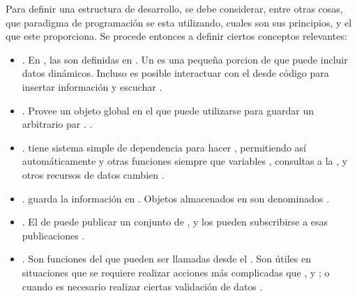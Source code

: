 Para definir una estructura de desarrollo, se debe considerar, entre otras cosas,  que paradigma de programación se esta utilizando, cuales son sus principios, y el \apiAS que este proporciona. Se procede entonces a definir ciertos conceptos relevantes:

	\begin{itemize}
		\item
			\textbf{\templatesMETEOR}. En \meteorNAME, las \viewsAS son definidas en \templatesMETEOR. Un \templateMETEOR es una pequeña porcion de \htmlNAME que puede incluir datos dinámicos. Incluso es posible interactuar con el \templateMETEOR desde código \javaScriptNAME para insertar información y escuchar \events \cite{online_meteor_documentation}.
		\item
			\textbf{\sessionMETEOR}. Provee un objeto global en el \clientAS que puede utilizarse para guardar un arbitrario par \keyValueDB. \cite{online_meteor_documentation}.
		\item
			\textbf{\trackerMETEOR}. \meteorNAME tiene sistema simple de dependencia para hacer \trackingMETEOR, permitiendo así automáticamente \rerunCPT \templatesMETEOR y otras funciones siempre que variables \sessionMETEOR, consultas a la \dataBaseDB, y otros recursos de datos cambien \cite{online_meteor_documentation}.
		\item
			\textbf{\collectionsMETEOR}. \meteorNAME guarda la información en \collectionsMETEOR. Objetos \javaScriptNAME almacenados en \collectionsMETEOR son denominados \documentsDB \cite{online_meteor_documentation}.

		\item
			\textbf{\publishsubscribeMETEOR}. El \serverAS de \meteorNAME puede publicar un conjunto de \documentsDB , y los \clientsAS pueden subscribirse a esas publicaciones \cite{online_meteor_documentation}.
		\item
			\textbf{\methodsMETEOR}\label{cap:arquitectura:section:generic_architecture_structure:itemize:methods_meteor}. Son funciones del \serverSideAS que pueden ser llamadas desde el \clientSideAS. Son útiles en situaciones que se requiere realizar acciones más complicadas que \insertDB, \updateDB y \removeDB; o cuando es necesario realizar ciertas validación de datos \cite{online_meteor_documentation}.
	\end{itemize}

